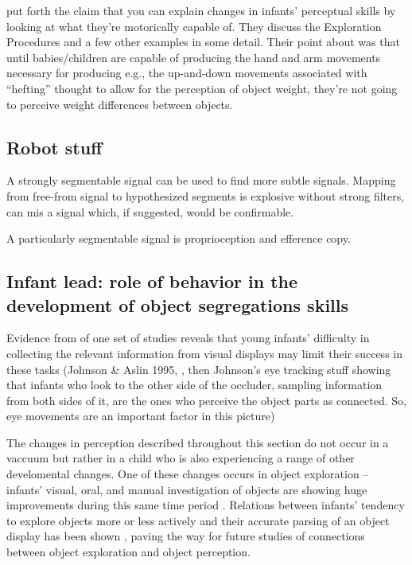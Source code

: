 
 put forth the
claim that you can explain changes in infants' perceptual skills by
looking at what they're motorically capable of.  They discuss the
\cite{lederman87hand} Exploration Procedures and a few other examples in
some detail.  Their point about  was that until
babies/children are capable of producing the hand and arm movements
necessary for producing e.g., the up-and-down movements associated
with ``hefting'' thought to allow for the perception of object weight,
they're not going to perceive weight differences between objects.


\subsection{Robot stuff}

A strongly segmentable signal can be used to find more subtle signals.
Mapping from free-from signal to hypothesized segments is explosive
without strong filters, can mis a signal which, if suggested, would
be confirmable.  

A particularly segmentable signal is proprioception and efference copy. 


\subsection{Infant lead: role of behavior in the development of object segregations skills}

Evidence from of one set of studies reveals that young
infants' difficulty in collecting the relevant information
from visual displays may limit their success in these tasks (Johnson \&
Aslin 1995, \cite{johnson96perception}, then Johnson's eye tracking stuff
\cite{johnson04where} showing
that infants who look to the other side of the occluder, sampling
information from both sides of it, are the ones who perceive the
object parts as connected.  So, eye movements are an important factor
in this picture)

The changes in perception described throughout this section
do not occur in a vaccuum but rather in a
child who is also experiencing a range of other develomental changes.
One of these changes occurs in object
exploration -- infants' visual, oral, and manual
investigation of objects are showing huge improvements during this
same time period \cite{rochat89object}.  Relations between infants'
tendency to explore objects more or less actively and their accurate
parsing of an object display has been shown \cite{needham00improvements}, paving
the way for future studies of connections between object exploration
and object perception.


